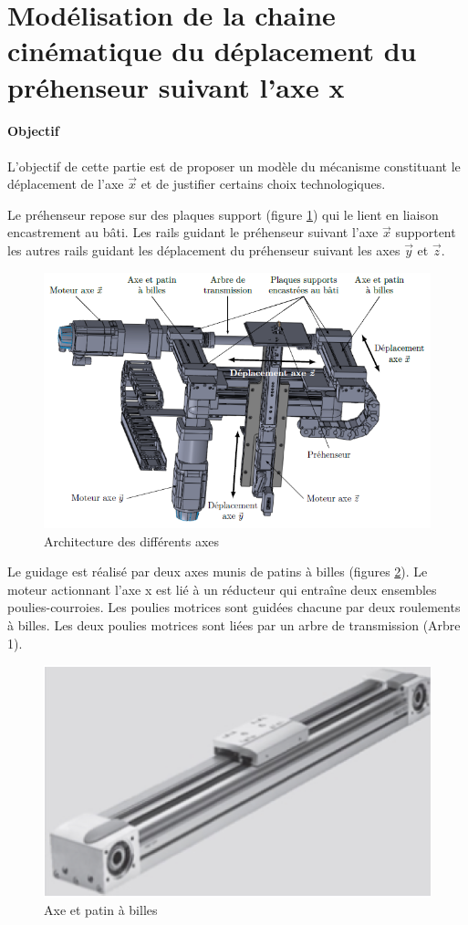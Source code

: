 \section{Modélisation de la chaine cinématique du déplacement du préhenseur suivant l’axe x}

\paragraph{Objectif}

L’objectif de cette partie est de proposer un modèle du mécanisme constituant le déplacement de l’axe $\overrightarrow{x}$ et de justifier certains choix technologiques.

Le préhenseur repose sur des plaques support (figure \ref{img08}) qui le lient en liaison encastrement au bâti. Les rails guidant le préhenseur suivant l’axe $\overrightarrow{x}$ supportent les autres rails guidant les déplacement du préhenseur suivant les axes $\overrightarrow{y}$ et $\overrightarrow{z}$.

\begin{figure}[!h]
\centering\includegraphics[width=0.75\linewidth]{img/fig08}
 \caption{Architecture des différents axes}
 \label{img08}
\end{figure}

Le guidage est réalisé par deux axes munis de patins à billes (figures \ref{img09}). Le moteur actionnant l’axe x est lié à un réducteur qui entraîne deux ensembles poulies-courroies. Les poulies motrices sont guidées chacune par deux roulements à billes. Les deux poulies motrices sont liées par un arbre de transmission (Arbre 1).

\begin{figure}[!h]
\centering\includegraphics[width=0.7\linewidth]{img/fig09}
 \caption{Axe et patin à billes}
 \label{img09}
\end{figure}


